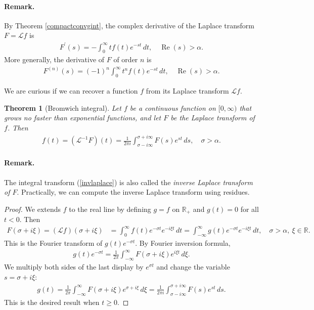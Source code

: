 \documentclass{article}
\numberwithin{equation}{section}
\newcommand{\bbR}{\mathbb{R}}
\renewcommand{\cal}{\mathcal}
\DeclareMathOperator{\re}{Re}
\theoremstyle{plain}
\newtheorem{theorem}{Theorem}[section]
\theoremstyle{definition}
\begin{document}
\paragraph{Remark.} By Theorem \ref{compactconvgint}, the complex derivative of the Laplace transform $F=\cal{L}f$ is
\begin{align*}
	F^\prime(s)=-\int_0^\infty tf(t)e^{-st}\,dt,\quad \re(s)>\alpha.
\end{align*}
More generally, the derivative of $F$ of order $n$ is
\begin{align*}
	F^{(n)}(s)=(-1)^n\int_0^\infty t^nf(t)e^{-st}\,dt,\quad\re(s)>\alpha.
\end{align*}

We are curious if we can recover a function $f$ from its Laplace transform $\cal{L}f$.
\begin{theorem}[Bromwich integral]
Let $f$ be a continuous function on $[0,\infty)$ that grows no faster than exponential functions, and let $F$ be the Laplace transform of $f$. Then
\begin{align}
	f(t)=(\cal{L}^{-1}F)(t)=\frac{1}{2\pi i}\int_{\sigma-i\infty}^{\sigma+i\infty}F(s)e^{st}\,ds,\quad \sigma>\alpha.\label{invlaplace}
\end{align}
\end{theorem}
\paragraph{Remark.} The integral transform (\ref{invlaplace}) is also called the \textit{inverse Laplace transform of $F$}. Practically, we can compute the inverse Laplace transform using residues.
\begin{proof}
We extends $f$ to the real line by defining $g=f$ on $\bbR_+$ and $g(t)=0$ for all $t<0$. Then
\begin{align*}
	F(\sigma+i\xi)=(\cal{L}f)(\sigma+i\xi)&=\int_0^\infty f(t)e^{-\sigma t}e^{-i\xi t}\,dt=\int_{-\infty}^\infty g(t)e^{-\sigma t}e^{-i\xi t}\,dt,\quad\sigma>\alpha,\ \xi\in\bbR.
\end{align*}
This is the Fourier transform of $g(t)e^{-\sigma t}$. By Fourier inversion formula,
\begin{align*}
	g(t)e^{-\sigma t}=\frac{1}{2\pi}\int_{-\infty}^\infty F(\sigma+i\xi)e^{i\xi t}\,d\xi.
\end{align*}
We multiply both sides of the last display by $e^{\sigma t}$ and change the variable $s=\sigma+i\xi$:
\begin{align*}
	g(t)=\frac{1}{2\pi}\int_{-\infty}^\infty F(\sigma+i\xi)e^{\sigma+i\xi}\,d\xi=\frac{1}{2\pi i}\int_{\sigma-i\infty}^{\sigma+i\infty}F(s)e^{st}\,ds.
\end{align*}
This is the desired result when $t\geq 0$.
\end{proof}
\end{document}
